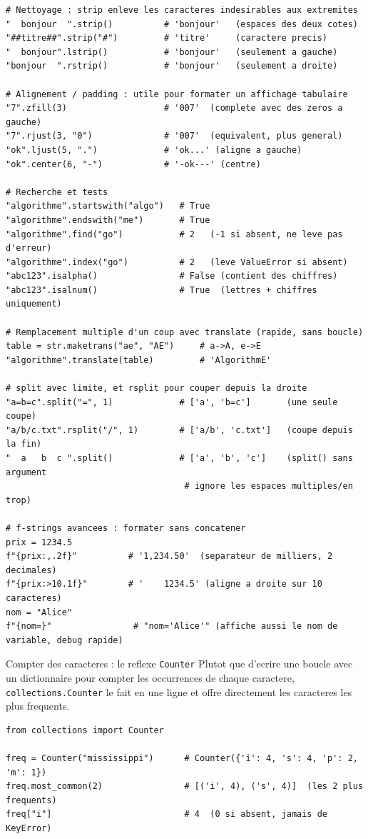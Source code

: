 \documentclass[11pt,a4paper]{article}
\begin{document}
\begin{lstlisting}
# Nettoyage : strip enleve les caracteres indesirables aux extremites
"  bonjour  ".strip()          # 'bonjour'   (espaces des deux cotes)
"##titre##".strip("#")         # 'titre'     (caractere precis)
"  bonjour".lstrip()           # 'bonjour'   (seulement a gauche)
"bonjour  ".rstrip()           # 'bonjour'   (seulement a droite)

# Alignement / padding : utile pour formater un affichage tabulaire
"7".zfill(3)                   # '007'  (complete avec des zeros a gauche)
"7".rjust(3, "0")              # '007'  (equivalent, plus general)
"ok".ljust(5, ".")             # 'ok...' (aligne a gauche)
"ok".center(6, "-")            # '-ok---' (centre)

# Recherche et tests
"algorithme".startswith("algo")   # True
"algorithme".endswith("me")       # True
"algorithme".find("go")           # 2   (-1 si absent, ne leve pas d'erreur)
"algorithme".index("go")          # 2   (leve ValueError si absent)
"abc123".isalpha()                # False (contient des chiffres)
"abc123".isalnum()                # True  (lettres + chiffres uniquement)

# Remplacement multiple d'un coup avec translate (rapide, sans boucle)
table = str.maketrans("ae", "AE")     # a->A, e->E
"algorithme".translate(table)         # 'AlgorithmE'

# split avec limite, et rsplit pour couper depuis la droite
"a=b=c".split("=", 1)             # ['a', 'b=c']       (une seule coupe)
"a/b/c.txt".rsplit("/", 1)        # ['a/b', 'c.txt']   (coupe depuis la fin)
"  a   b  c ".split()             # ['a', 'b', 'c']    (split() sans argument
                                   # ignore les espaces multiples/en trop)

# f-strings avancees : formater sans concatener
prix = 1234.5
f"{prix:,.2f}"          # '1,234.50'  (separateur de milliers, 2 decimales)
f"{prix:>10.1f}"        # '    1234.5' (aligne a droite sur 10 caracteres)
nom = "Alice"
f"{nom=}"                # "nom='Alice'" (affiche aussi le nom de variable, debug rapide)
\end{lstlisting}

\begin{infobox}{Compter des caracteres : le reflexe \texttt{Counter}}
Plutot que d'ecrire une boucle avec un dictionnaire pour compter les occurrences
de chaque caractere, \texttt{collections.Counter} le fait en une ligne et offre
directement les caracteres les plus frequents.
\begin{lstlisting}
from collections import Counter

freq = Counter("mississippi")      # Counter({'i': 4, 's': 4, 'p': 2, 'm': 1})
freq.most_common(2)                # [('i', 4), ('s', 4)]  (les 2 plus frequents)
freq["i"]                          # 4  (0 si absent, jamais de KeyError)
\end{lstlisting}
\end{infobox}
\end{document}
